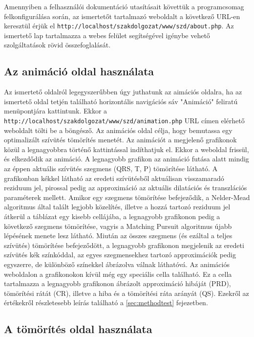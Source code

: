 \documentclass[oneside,titlepage,12pt,a4paper]{report}
\begin{document}
Amennyiben a felhasználói dokumentáció utasításait követtük a programcsomag felkonfigurálása során, az ismertetőt tartalmazó weboldalt a következő URL-en keresztül érjük el \texttt{http://localhost/szakdolgozat/www/szd/about.php}. Az ismertető lap tartalmazza a webes felület segítségével igénybe vehető szolgáltatások rövid összefoglalását. 

\subsection*{Az animáció oldal használata}

Az ismertető oldalról legegyszerűbben úgy juthatunk az aimációs oldalra, ha az ismertető oldal tetjén található horizontális navigációs sáv "Animáció" feliratú menüpontjára kattintunk. Ekkor a \texttt{http://localhost/szakdolgozat/www/szd/animation.php} URL címen elérhető weboldalt tölti be a böngésző. Az animációs oldal célja, hogy bemutassa egy optimalizált szívütés tömörítés menetét. Az animációt a megjelenő grafikonok közül a legnagyobbra történő kattintással indíthatjuk el. Ekkor a weboldal frissül, és elkezdődik az animáció. A legnagyobb grafikon az animáció futása alatt mindig az éppen aktuális szívütés szegmens (QRS, T, P) tömörítése látható. A grafikonban kékkel látható az eredeti szívütésből aktuálisan visszamaradó reziduum jel, pirossal pedig az approximáció az aktuális dilatációs és transzlációs paraméterek mellett. Amikor egy szegmens tömörítése befejeződik, a Nelder-Mead algoritmus által talált legjobb közelítés, illetve a hozzá tartozó reziduum jel átkerül a táblázat egy kisebb cellájába, a legnagyobb grafikonon pedig a következő szegmens tömörítése, vagyis a Matching Pursuit algoritmus újabb lépésének menete lesz látható. Miután az összes szegmens (és ezáltal a teljes szívütés) tömörítése befejeződött, a legnagyobb grafikonon megjelenik az eredeti szívütés kék színkóddal, az egyes szegmensekhez tartozó approximációk pedig egyszerre, de különböző színekkel ábrázolva válnak láthatóvá. Az animációs weboldalon a grafikonokon kívül még egy speciális cella található. Ez a cella tartalmazza a legnagyobb grafikonon ábrázolt approximáció hibáját (PRD), tömörítési rátát (CR), illetve a hiba és a tömörítési ráta arányát (QS). Ezekről az értékekről részletesebb leírás található a \ref{sec:methodtest} fejezetben.

\subsection*{A tömörítés oldal használata}
\end{document}
